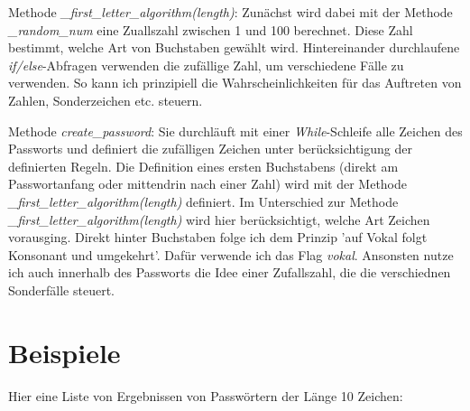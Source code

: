 \documentclass[a4paper,10pt,ngerman]{scrartcl}
\begin{document}
Methode \textit{\_first\_letter\_algorithm(length)}: 
Zunächst wird dabei mit der Methode \textit{\_random\_num} eine Zuallszahl zwischen 1 und 100 berechnet. Diese Zahl bestimmt, welche Art von Buchstaben gewählt wird. Hintereinander durchlaufene \textit{if/else}-Abfragen verwenden die zufällige Zahl, um verschiedene Fälle zu verwenden. So kann ich prinzipiell die Wahrscheinlichkeiten für das Auftreten von Zahlen, Sonderzeichen etc. steuern. 

Methode \textit{create\_password}: Sie durchläuft mit einer \textit{While}-Schleife alle Zeichen des Passworts und definiert die zufälligen Zeichen unter berücksichtigung der definierten Regeln. Die Definition eines ersten Buchstabens (direkt am Passwortanfang oder mittendrin nach einer Zahl) wird mit der Methode \textit{\_first\_letter\_algorithm(length)} definiert. 
Im Unterschied zur Methode \textit{\_first\_letter\_algorithm(length)} wird hier berücksichtigt, welche Art Zeichen vorausging. Direkt hinter Buchstaben folge ich dem Prinzip 'auf Vokal folgt Konsonant und umgekehrt'. Dafür verwende ich das Flag \textit{vokal}. Ansonsten nutze ich auch innerhalb des Passworts die Idee einer Zufallszahl, die die verschiednen Sonderfälle steuert.   

\section{Beispiele}
Hier eine Liste von Ergebnissen von Passwörtern der Länge 10 Zeichen: 
\end{document}
